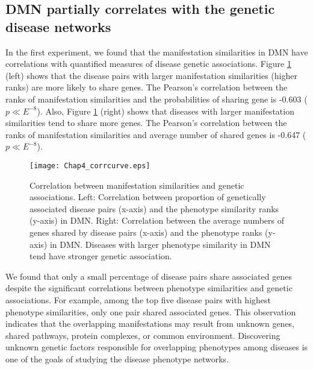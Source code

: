 \subsection{DMN partially correlates with the genetic disease networks}
In the first experiment, we found that the manifestation similarities in DMN have correlations with quantified measures of disease genetic associations.
Figure \ref{corrcurve} (left) shows that the disease pairs with larger manifestation similarities (higher ranks) are more likely to share genes.
The Pearson's correlation between the ranks of manifestation similarities and the probabilities of sharing gene is -0.603 ($p \ll E^{-8}$).
Also, Figure \ref{corrcurve} (right) shows that diseases with larger manifestation similarities tend to share more genes.
The Pearson's correlation between the ranks of manifestation similarities and average number of shared genes is -0.647 ($p \ll E^{-8}$).
      \begin{figure}[h!]
        \begin{center}
\texttt{[image: Chap4\_corrcurve.eps]}
\end{center}
  \caption{Correlation between manifestation similarities and genetic associations.
       Left: Correlation between proportion of genetically associated disease pairs (x-axis) and the phenotype similarity ranks (y-axis) in DMN. Right: Correlation between the average numbers of genes shared by disease pairs (x-axis) and the phenotype ranks (y-axis) in DMN. Diseases with larger phenotype similarity in DMN tend have stronger genetic association.}\label{corrcurve}
      \end{figure}

We found that only a small percentage of disease pairs share associated genes despite the significant correlations between phenotype similarities and genetic associations.
For example, among the top five disease pairs with highest phenotype similarities,
only one pair shared associated genes.
This observation indicates that the overlapping manifestations may result from unknown genes, shared pathways, protein complexes, or common environment.
Discovering unknown genetic factors responsible for overlapping phenotypes among diseases is one of the goals of studying the disease phenotype networks.

